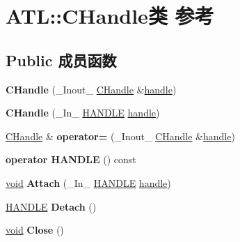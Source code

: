 \hypertarget{class_a_t_l_1_1_c_handle}{}\section{A\+TL\+:\+:C\+Handle类 参考}
\label{class_a_t_l_1_1_c_handle}
\subsection*{Public 成员函数}
\begin{DoxyCompactItemize}
\item 
\mbox{\label{class_a_t_l_1_1_c_handle_a247edb98998f3b0954697003490ace8e}} 
{\bfseries C\+Handle} (\+\_\+\+Inout\+\_\+ \hyperlink{class_a_t_l_1_1_c_handle}{C\+Handle} \&\hyperlink{structhandle}{handle})
\item 
\mbox{\label{class_a_t_l_1_1_c_handle_aa80f6a3a7e215bedcb859d6bc327b4c6}} 
{\bfseries C\+Handle} (\+\_\+\+In\+\_\+ \hyperlink{interfacevoid}{H\+A\+N\+D\+LE} \hyperlink{structhandle}{handle})
\item 
\mbox{\label{class_a_t_l_1_1_c_handle_a4891106231f99e5aec72f06af48e287a}} 
\hyperlink{class_a_t_l_1_1_c_handle}{C\+Handle} \& {\bfseries operator=} (\+\_\+\+Inout\+\_\+ \hyperlink{class_a_t_l_1_1_c_handle}{C\+Handle} \&\hyperlink{structhandle}{handle})
\item 
\mbox{\label{class_a_t_l_1_1_c_handle_ad0a0a4d89ebc02b344c72fc5ed510eb4}} 
{\bfseries operator H\+A\+N\+D\+LE} () const
\item 
\mbox{\label{class_a_t_l_1_1_c_handle_abd90aecdb006ad1b60c104254e1983c9}} 
\hyperlink{interfacevoid}{void} {\bfseries Attach} (\+\_\+\+In\+\_\+ \hyperlink{interfacevoid}{H\+A\+N\+D\+LE} \hyperlink{structhandle}{handle})
\item 
\mbox{\label{class_a_t_l_1_1_c_handle_a0854d69901e2df23d23cfadfd18482a7}} 
\hyperlink{interfacevoid}{H\+A\+N\+D\+LE} {\bfseries Detach} ()
\item 
\mbox{\label{class_a_t_l_1_1_c_handle_a64aa623fc2323b8673fbc8d735d378d3}} 
\hyperlink{interfacevoid}{void} {\bfseries Close} ()
\end{DoxyCompactItemize}

